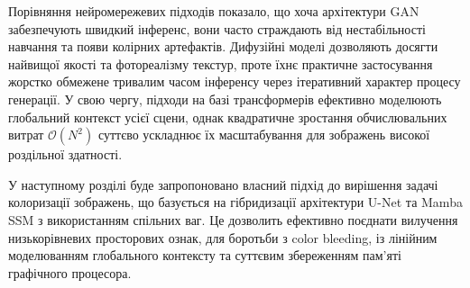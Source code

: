     Порівняння нейромережевих підходів показало, що хоча архітектури GAN забезпечують швидкий інференс, вони часто страждають від нестабільності навчання та появи колірних артефактів.
    Дифузійні моделі дозволяють досягти найвищої якості та фотореалізму текстур, проте їхнє практичне застосування жорстко обмежене тривалим часом інференсу через ітеративний характер процесу генерації.
    У свою чергу, підходи на базі трансформерів ефективно моделюють глобальний контекст усієї сцени, однак квадратичне зростання обчислювальних витрат $\mathcal{O}(N^2)$ суттєво ускладнює їх масштабування для зображень високої роздільної здатності.
    
    У наступному розділі буде запропоновано власний підхід до вирішення задачі колоризації зображень, що базується на гібридизації архітектури U-Net та Mamba SSM з використанням спільних ваг.
    Це дозволить ефективно поєднати вилучення низькорівневих просторових ознак, для боротьби з color bleeding, із лінійним моделюванням глобального контексту та суттєвим збереженням пам'яті графічного процесора.







